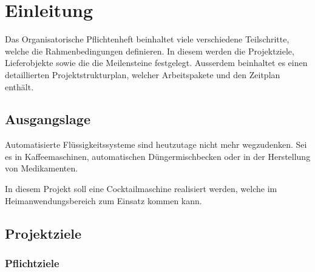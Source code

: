 \clearpage
\section{Einleitung}\label{sec:Einleitung}
Das Organisatorische Pflichtenheft beinhaltet viele verschiedene Teilschritte, welche die Rahmenbedingungen definieren. In diesem werden die Projektziele, Lieferobjekte sowie die die Meilensteine festgelegt. Ausserdem beinhaltet es einen detaillierten Projektstrukturplan, welcher Arbeitspakete und den Zeitplan enthält.

\subsection{Ausgangslage}\label{subsec:Ausgangslage}

Automatisierte Flüssigkeitssysteme sind heutzutage nicht mehr wegzudenken. Sei es in Kaffeemaschinen, automatischen Düngermischbecken oder in der Herstellung von Medikamenten.

In diesem Projekt soll eine Cocktailmaschine realisiert werden, welche im Heimanwendungsbereich zum Einsatz kommen kann. 
 
\newpage
\subsection{Projektziele}\label{subsec:Projektziele}

\subsubsection{Pflichtziele}\label{sec:Pflichtziele}

